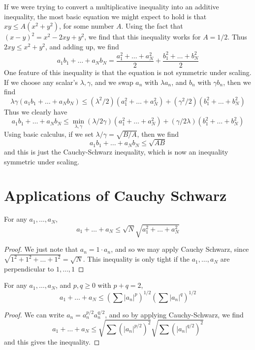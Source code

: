 If we were trying to convert a multiplicative inequality into an additive inequality, the most basic equation we might expect to hold is that $xy \leq A(x^2 + y^2)$, for some number $A$. Using the fact that $(x - y)^2 = x^2 - 2xy + y^2$, we find that this inequality works for $A = 1/2$. Thus $2xy \leq x^2 + y^2$, and adding up, we find
%
\[ a_1b_1 + \dots + a_Nb_N = \frac{a_1^2 + \dots + a_N^2}{2} + \frac{b_1^2 + \dots + b_N^2}{2} \]
%
One feature of this inequality is that the equation is not symmetric under scaling. If we choose any scalar's $\lambda, \gamma$, and we swap $a_n$ with $\lambda a_n$, and $b_n$ with $\gamma b_n$, then we find
%
\[ \lambda \gamma ( a_1b_1 + \dots + a_Nb_N ) \leq (\lambda^2/2) (a_1^2 + \dots + a_N^2) + (\gamma^2/2) (b_1^2 + \dots + b_N^2) \]
%
Thus we clearly have
%
\[ a_1b_1 + \dots + a_Nb_N \leq \min_{\lambda,\gamma} (\lambda/2\gamma) (a_1^2 + \dots + a_N^2) + (\gamma/2\lambda) (b_1^2 + \dots + b_N^2) \]
%
Using basic calculus, if we set $\lambda/\gamma = \sqrt{B/A}$, then we find
%
\[ a_1b_1 + \dots + a_Nb_N \leq \sqrt{AB} \]
%
and this is just the Cauchy-Schwarz inequality, which is now an inequality symmetric under scaling.

\section{Applications of Cauchy Schwarz}

\begin{theorem}
    For any $a_1, \dots, a_N$,
    \[ a_1 + \dots + a_N \leq \sqrt{N} \sqrt{a_1^2 + \dots + a_N^2} \]
\end{theorem}
\begin{proof}
    We just note that $a_n = 1 \cdot a_n$, and so we may apply Cauchy Schwarz, since $\sqrt{1^2 + 1^2 + \dots + 1^2} = \sqrt{N}$. This inequality is only tight if the $a_1, \dots, a_N$ are perpendicular to $1,\dots,1$
\end{proof}

\begin{theorem}
    For any $a_1, \dots, a_N$, and $p,q \geq 0$ with $p + q = 2$,
    \[ a_1 + \dots + a_N \leq \left( \sum |a_n|^p \right)^{1/2} \left( \sum |a_n|^q \right)^{1/2} \]
\end{theorem} 
\begin{proof}
    We can write $a_n = a_n^{p/2} a_n^{q/2}$, and so by applying Cauchy-Schwarz, we find
    \[ a_1 + \dots + a_N \leq \sqrt{\sum (|a_n|^{p/2})^2} \sqrt{\sum (|a_n|^{q/2})^2} \]
    and this gives the inequality.
\end{proof}

